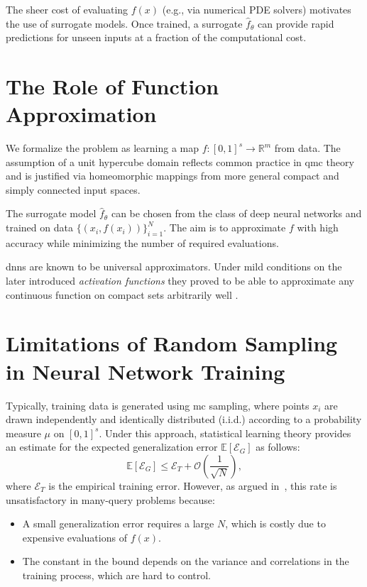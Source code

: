 The sheer cost of evaluating $f(x)$ (e.g., via numerical PDE solvers) motivates
the use of surrogate models. Once trained, a surrogate $\hat{f}_\theta$ can
provide rapid predictions for unseen inputs at a fraction of the computational
cost.

\section{The Role of Function Approximation}
We formalize the problem as learning a map $f \colon [0,1]^s \to \mathbb{R}^m$
from data. The assumption of a unit hypercube domain reflects common practice in
\ac{qmc} theory and is justified via homeomorphic mappings from more general
compact and simply connected input spaces.

The surrogate model $\hat{f}_\theta$ can be chosen from the class of deep neural
networks and trained on data $\{(x_i, f(x_i))\}_{i=1}^N$. The aim is to
approximate $f$ with high accuracy while minimizing the number of required
evaluations.

\aclp{dnn} are known to be universal approximators. Under mild conditions on the
later introduced \emph{activation functions} they proved to be able to
approximate any continuous function on compact sets arbitrarily well
\cite{cybenko1989approximation}.

\section{Limitations of Random Sampling in Neural Network Training}
Typically, training data is generated using \acl{mc} sampling, where points $x_i$ are drawn independently and identically distributed (i.i.d.) according to a probability measure $\mu$ on $[0,1]^s$. Under this approach, statistical learning theory provides an estimate for the expected generalization error $\mathbb{E}[\mathcal{E}_G]$ as follows:
\begin{equation*}
\mathbb{E}[\mathcal{E}_G] \leq \mathcal{E}_T + \mathcal{O}\left(\frac{1}{\sqrt{N}}\right),
\end{equation*}
where $\mathcal{E}_T$ is the empirical training error. However, as argued
in~\cite{mishra2021enhancing}, this rate is unsatisfactory in many-query
problems because:
\begin{itemize}
  \item A small generalization error requires a large $N$, which is costly due
  to expensive evaluations of $f(x)$.
  \item The constant in the bound depends on the variance and correlations in
  the training process, which are hard to control.
\end{itemize}


